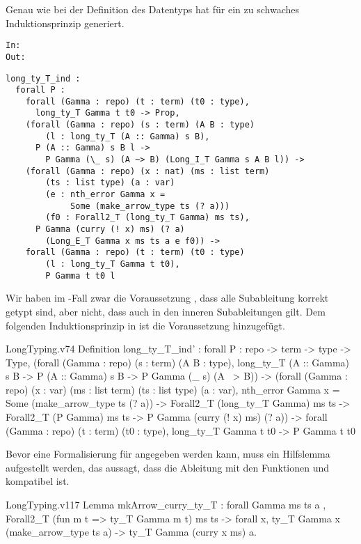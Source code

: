Genau wie bei der Definition des Datentyps  hat \coq{} für  ein zu schwaches Induktionsprinzip generiert.
\begin{icode}
\texttt{In:} \\
    \texttt{Out:} 
    \begin{verbatim}
long_ty_T_ind : 
  forall P : 
    forall (Gamma : repo) (t : term) (t0 : type), 
      long_ty_T Gamma t t0 -> Prop,
    (forall (Gamma : repo) (s : term) (A B : type) 
        (l : long_ty_T (A :: Gamma) s B),
      P (A :: Gamma) s B l -> 
        P Gamma (\_ s) (A ~> B) (Long_I_T Gamma s A B l)) ->
    (forall (Gamma : repo) (x : nat) (ms : list term) 
        (ts : list type) (a : var)
        (e : nth_error Gamma x = 
             Some (make_arrow_type ts (? a))) 
        (f0 : Forall2_T (long_ty_T Gamma) ms ts),
      P Gamma (curry (! x) ms) (? a) 
        (Long_E_T Gamma x ms ts a e f0)) ->
    forall (Gamma : repo) (t : term) (t0 : type) 
        (l : long_ty_T Gamma t t0), 
        P Gamma t t0 l
    \end{verbatim}    
\end{icode}
Wir haben im -Fall zwar die Voraussetzung , dass alle Subableitung korrekt getypt sind, aber nicht, dass  auch in den inneren Subableitungen gilt. Dem folgenden Induktionsprinzip in  ist die Voraussetzung  hinzugefügt.
\begin{code}{LongTyping.v}{}{74}
Definition long_ty_T_ind' :
    forall P : repo -> term -> type -> Type,
      (forall (Gamma : repo) (s : term) (A B : type),
        long_ty_T (A :: Gamma) s B ->
          P (A :: Gamma) s B -> P Gamma (\_ s) (A ~> B)) ->
      (forall (Gamma : repo) (x : var) 
        (ms : list term) (ts : list type) (a : var),
          nth_error Gamma x = Some (make_arrow_type ts (? a)) ->
            Forall2_T (long_ty_T Gamma) ms ts -> 
              Forall2_T (P Gamma) ms ts -> 
                P Gamma (curry (! x) ms) (? a)) ->
      forall (Gamma : repo) (t : term) (t0 : type),
        long_ty_T Gamma t t0 -> P Gamma t t0
\end{code}

Bevor eine Formalisierung für  angegeben werden kann, muss ein Hilfslemma aufgestellt werden, das aussagt, dass die Ableitung  mit den Funktionen  und  kompatibel ist.
\begin{code}{LongTyping.v}{}{117}
Lemma mkArrow_curry_ty_T : forall Gamma ms ts a ,
    Forall2_T (fun m t => ty_T Gamma m t) ms ts ->
      forall x, ty_T Gamma x (make_arrow_type ts a) ->
        ty_T Gamma (curry x ms) a.
\end{code}

